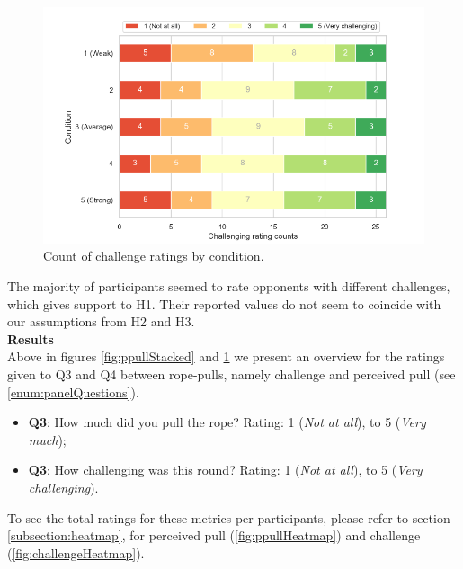 \begin{figure}[H]
\captionsetup{justification=centering,margin=0.1cm}
 \centering
 \hspace{-20mm}
\includegraphics[scale=0.7]{Files/Plots/challenge_by_condition_count_staked.png}
\caption{Count of challenge ratings by condition.}
\label{fig:challengeStacked}
\end{figure}
\pagebreak
The majority of participants seemed to rate opponents with different challenges, which gives support to H1. Their reported values do not seem to coincide with our assumptions from H2 and H3.
\\
\textbf{Results}\\
Above in figures \ref{fig:ppullStacked} and 
\ref{fig:challengeStacked} we present an overview for the ratings given to Q3 and Q4 between rope-pulls, namely challenge and perceived pull (see \ref{enum:panelQuestions}). 
\begin{itemize}
\itemsep0em
 \item \textbf{Q3}: How much did you pull the rope? Rating: 1 (\textit{Not at all}), to 5 (\textit{Very much});
\item \textbf{Q3}: How challenging was this round? Rating: 1 (\textit{Not at all}), to 5 (\textit{Very challenging}).
\end{itemize}
To see the total ratings for these metrics per participants, please refer to section \ref{subsection:heatmap}, for perceived pull (\ref{fig:ppullHeatmap}) and challenge (\ref{fig:challengeHeatmap}).

